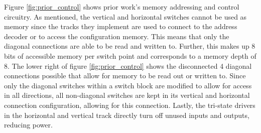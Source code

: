 Figure \ref{fig:prior_control} shows prior work's memory addressing and control circuitry. As mentioned, the vertical and horizontal switches cannot be used as memory since the tracks they implement are used to connect to the address decoder or to access the configuration memory. This means that only the diagonal connections are able to be read and written to. Further, this makes up 8 bits of accessible memory per switch point and corresponds to a memory depth of 8.  The lower right of figure \ref{fig:prior_control} shows the disconnected 4 diagonal connections possible that allow for memory to be read out or written to. Since only the diagonal switches within a switch block are modified to allow for access in all directions, all non-diagonal switches are kept in its vertical and horizontal connection configuration, allowing for this connection. Lastly, the tri-state drivers in the horizontal and vertical track directly turn off unused inputs and outputs, reducing power.

